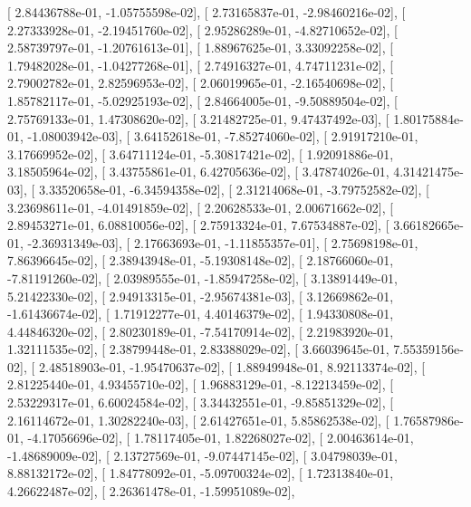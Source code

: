 \documentclass{article}
\begin{document}
       [  2.84436788e-01,  -1.05755598e-02],
       [  2.73165837e-01,  -2.98460216e-02],
       [  2.27333928e-01,  -2.19451760e-02],
       [  2.95286289e-01,  -4.82710652e-02],
       [  2.58739797e-01,  -1.20761613e-01],
       [  1.88967625e-01,   3.33092258e-02],
       [  1.79482028e-01,  -1.04277268e-01],
       [  2.74916327e-01,   4.74711231e-02],
       [  2.79002782e-01,   2.82596953e-02],
       [  2.06019965e-01,  -2.16540698e-02],
       [  1.85782117e-01,  -5.02925193e-02],
       [  2.84664005e-01,  -9.50889504e-02],
       [  2.75769133e-01,   1.47308620e-02],
       [  3.21482725e-01,   9.47437492e-03],
       [  1.80175884e-01,  -1.08003942e-03],
       [  3.64152618e-01,  -7.85274060e-02],
       [  2.91917210e-01,   3.17669952e-02],
       [  3.64711124e-01,  -5.30817421e-02],
       [  1.92091886e-01,   3.18505964e-02],
       [  3.43755861e-01,   6.42705636e-02],
       [  3.47874026e-01,   4.31421475e-03],
       [  3.33520658e-01,  -6.34594358e-02],
       [  2.31214068e-01,  -3.79752582e-02],
       [  3.23698611e-01,  -4.01491859e-02],
       [  2.20628533e-01,   2.00671662e-02],
       [  2.89453271e-01,   6.08810056e-02],
       [  2.75913324e-01,   7.67534887e-02],
       [  3.66182665e-01,  -2.36931349e-03],
       [  2.17663693e-01,  -1.11855357e-01],
       [  2.75698198e-01,   7.86396645e-02],
       [  2.38943948e-01,  -5.19308148e-02],
       [  2.18766060e-01,  -7.81191260e-02],
       [  2.03989555e-01,  -1.85947258e-02],
       [  3.13891449e-01,   5.21422330e-02],
       [  2.94913315e-01,  -2.95674381e-03],
       [  3.12669862e-01,  -1.61436674e-02],
       [  1.71912277e-01,   4.40146379e-02],
       [  1.94330808e-01,   4.44846320e-02],
       [  2.80230189e-01,  -7.54170914e-02],
       [  2.21983920e-01,   1.32111535e-02],
       [  2.38799448e-01,   2.83388029e-02],
       [  3.66039645e-01,   7.55359156e-02],
       [  2.48518903e-01,  -1.95470637e-02],
       [  1.88949948e-01,   8.92113374e-02],
       [  2.81225440e-01,   4.93455710e-02],
       [  1.96883129e-01,  -8.12213459e-02],
       [  2.53229317e-01,   6.60024584e-02],
       [  3.34432551e-01,  -9.85851329e-02],
       [  2.16114672e-01,   1.30282240e-03],
       [  2.61427651e-01,   5.85862538e-02],
       [  1.76587986e-01,  -4.17056696e-02],
       [  1.78117405e-01,   1.82268027e-02],
       [  2.00463614e-01,  -1.48689009e-02],
       [  2.13727569e-01,  -9.07447145e-02],
       [  3.04798039e-01,   8.88132172e-02],
       [  1.84778092e-01,  -5.09700324e-02],
       [  1.72313840e-01,   4.26622487e-02],
       [  2.26361478e-01,  -1.59951089e-02],
\end{document}

